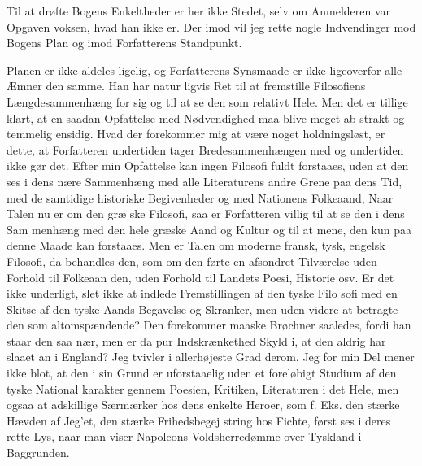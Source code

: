 \documentclass[12pt,a4paper,openany]{book}
\begin{document}
Til at drøfte Bogens Enkeltheder er her ikke Stedet, selv
om Anmelderen var Opgaven voksen, hvad han ikke er. Der\-%
imod vil jeg rette nogle Indvendinger mod Bogens Plan og imod
Forfatterens Standpunkt.

Planen er ikke aldeles ligelig, og Forfatterens Synsmaade
er ikke ligeoverfor alle Æmner den samme. Han har natur\-%
ligvis Ret til at fremstille Filosofiens Længdesammenhæng for
sig og til at se den som relativt Hele. Men det er tillige klart,
at en saadan Opfattelse med Nødvendighed maa blive meget ab\-%
strakt og temmelig ensidig. Hvad der forekommer mig at være
noget holdningsløst, er dette, at Forfatteren undertiden tager
Bredesammenhængen med og undertiden ikke gør det. Efter
min Opfattelse kan ingen Filosofi fuldt forstaaes, uden at den
ses i dens nære Sammenhæng med alle Literaturens andre
Grene paa dens Tid, med de samtidige historiske Begivenheder
og med Nationens Folkeaand, Naar Talen nu er om den græ\-%
ske Filosofi, saa er Forfatteren villig til at se den i dens Sam\-%
menhæng med den hele græske Aand og Kultur og til at mene,
den kun paa denne Maade kan forstaaes. Men er Talen om
moderne fransk, tysk, engelsk Filosofi, da behandles den, som
om den førte en afsondret Tilværelse uden Forhold til Folkeaan\-%
den, uden Forhold til Landets Poesi, Historie osv. Er det ikke
underligt, slet ikke at indlede Fremstillingen af den tyske Filo\-%
sofi med en Skitse af den tyske Aands Begavelse og Skranker,
men uden videre at betragte den som altomspændende? Den
forekommer maaske Brøchner saaledes, fordi han staar den
saa nær, men er da pur Indskrænkethed Skyld i, at den
aldrig har slaaet an i England? Jeg tvivler i allerhøjeste Grad
derom. Jeg for min Del mener ikke blot, at den i sin Grund
er uforstaaelig uden et foreløbigt Studium af den tyske National\-%
karakter gennem Poesien, Kritiken, Literaturen i det Hele, men
ogsaa at adskillige Særmærker hos dens enkelte Heroer, som
f. Eks. den stærke Hævden af Jeg'et, den stærke Frihedsbegej\-%
string hos Fichte, først ses i deres rette Lys, naar man viser
Napoleons Voldsherredømme over Tyskland i Baggrunden.
\end{document}
